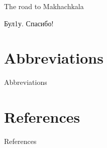 \begin{frame}{The road to Makhachkala}
\begin{figure}[h]
\centering
{}
\end{figure}
\end{frame}

\begin{frame}{Бул1у. Спасибо!}
\begin{figure}[h]
\centering
{}
\end{figure}
\end{frame}

\section{Abbreviations}
\begin{frame}{Abbreviations}

\tiny{\printglossary}

\end{frame}

\section{References}
\begin{frame}{References}

\printbibliography

\end{frame}


